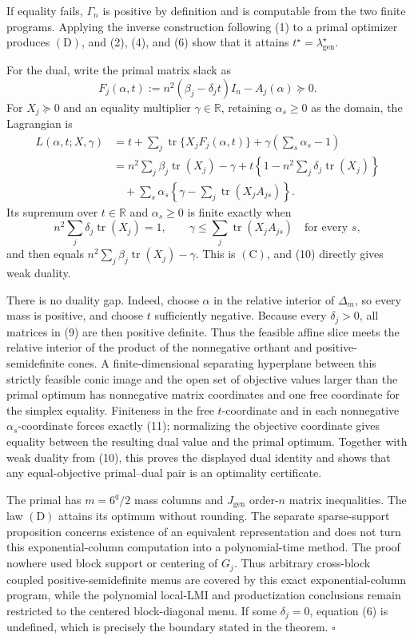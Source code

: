 If equality fails, \(\Gamma_n\) is positive by definition and is computable from the two finite programs. Applying the inverse construction following (1) to a primal optimizer produces \((\mathrm D)\), and (2), (4), and (6) show that it attains \(t^\star=\lambda_{\mathrm{gen}}^\star\).

For the dual, write the primal matrix slack as
\[
F_j(\alpha,t)
:=n^2(\beta_j-\delta_jt)I_n-A_j(\alpha)\succeq0.
\tag{9}
\]
For \(X_j\succeq0\) and an equality multiplier \(\gamma\in\mathbb R\), retaining \(\alpha_s\ge0\) as the domain, the Lagrangian is
\[
\begin{aligned}
L(\alpha,t;X,\gamma)
&=t+\sum_j\operatorname{tr}\{X_jF_j(\alpha,t)\}
+\gamma\left(\sum_s\alpha_s-1\right)\\
&=n^2\sum_j\beta_j\operatorname{tr}(X_j)-\gamma
+t\left\{1-n^2\sum_j\delta_j\operatorname{tr}(X_j)\right\}\\
&\quad+\sum_s\alpha_s
\left\{\gamma-\sum_j\operatorname{tr}(X_jA_{js})\right\}.
\end{aligned}
\tag{10}
\]
Its supremum over \(t\in\mathbb R\) and \(\alpha_s\ge0\) is finite exactly when
\[
n^2\sum_j\delta_j\operatorname{tr}(X_j)=1,
\qquad
\gamma\le\sum_j\operatorname{tr}(X_jA_{js})
\quad\text{for every }s,
\tag{11}
\]
and then equals \(n^2\sum_j\beta_j\operatorname{tr}(X_j)-\gamma\). This is \((\mathrm C)\), and (10) directly gives weak duality.

There is no duality gap. Indeed, choose \(\alpha\) in the relative interior of \(\Delta_m\), so every mass is positive, and choose \(t\) sufficiently negative. Because every \(\delta_j>0\), all matrices in (9) are then positive definite. Thus the feasible affine slice meets the relative interior of the product of the nonnegative orthant and positive-semidefinite cones. A finite-dimensional separating hyperplane between this strictly feasible conic image and the open set of objective values larger than the primal optimum has nonnegative matrix coordinates and one free coordinate for the simplex equality. Finiteness in the free \(t\)-coordinate and in each nonnegative \(\alpha_s\)-coordinate forces exactly (11); normalizing the objective coordinate gives equality between the resulting dual value and the primal optimum. Together with weak duality from (10), this proves the displayed dual identity and shows that any equal-objective primal--dual pair is an optimality certificate.

The primal has \(m=6^q/2\) mass columns and \(J_{\mathrm{gen}}\) order-\(n\) matrix inequalities. The law \((\mathrm D)\) attains its optimum without rounding. The separate sparse-support proposition concerns existence of an equivalent representation and does not turn this exponential-column computation into a polynomial-time method. The proof nowhere used block support or centering of \(G_j\). Thus arbitrary cross-block coupled positive-semidefinite menus are covered by this exact exponential-column program, while the polynomial local-LMI and productization conclusions remain restricted to the centered block-diagonal menu. If some \(\delta_j=0\), equation (6) is undefined, which is precisely the boundary stated in the theorem. \(\square\)